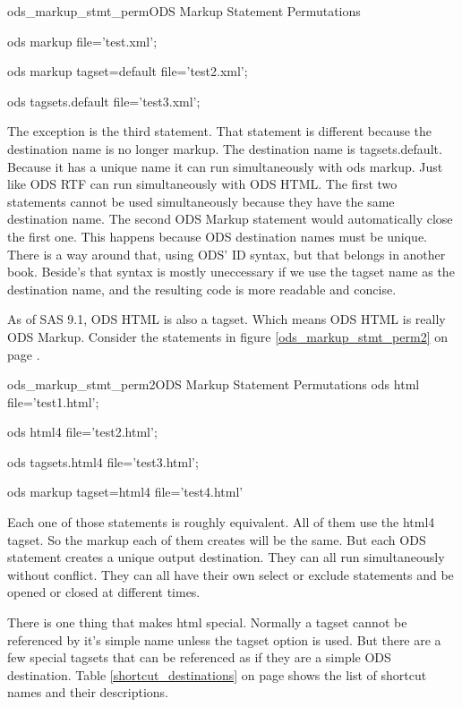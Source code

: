 \begin{fvcode}{ods_markup_stmt_perm}{ODS Markup Statement Permutations}

    ods markup file='test.xml';

    ods markup tagset=default file='test2.xml';

    ods tagsets.default file='test3.xml';

\end{fvcode}

The exception is the third statement.  That statement is different because the destination
name is no longer markup.  The destination name is tagsets.default.   Because it has a
unique name it can run simultaneously with ods markup.  Just like ODS RTF can run simultaneously
with ODS HTML.  The first two statements cannot be used simultaneously because they have the
same destination name.  The second ODS Markup 
statement would automatically close the first one.  This happens because ODS destination names
must be unique.  There is a way around that, using ODS' ID syntax, but that belongs in another
book.  Beside's that syntax is mostly uneccessary if we use the tagset name as the destination
name, and the resulting code is more readable and concise.


As of SAS 9.1, ODS HTML is also a tagset.  Which means ODS HTML is really ODS Markup.  Consider
the statements in figure \ref{ods_markup_stmt_perm2} on page \pageref{ods_markup_stmt_perm2}.

\begin{fvcode}{ods_markup_stmt_perm2}{ODS Markup Statement Permutations}
    ods html file='test1.html';

    ods html4 file='test2.html';

    ods tagsets.html4 file='test3.html';

    ods markup tagset=html4 file='test4.html'
\end{fvcode}

Each one of those statements is roughly equivalent.  All of them use the html4 tagset.  So
the markup each of them creates will be the same.  But each ODS statement creates a unique
output destination.  They can all run simultaneously without conflict.  They can all have their
own select or exclude statements and be opened or closed at different times.   

There is one thing that makes html special.  Normally a tagset cannot be referenced by
it's simple name unless the tagset option is used. But there are a few special tagsets that
can be referenced as if they are a simple ODS destination.  
Table \ref{shortcut_destinations} on page \pageref{shortcut_destinations} shows the list
of shortcut names and their descriptions.


